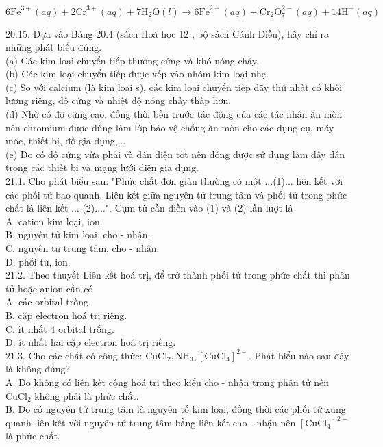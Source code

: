 \documentclass[10pt]{article}
\begin{document}
$$
6 \mathrm{Fe}^{3+}(a q)+2 \mathrm{Cr}^{3+}(a q)+7 \mathrm{H}_{2} \mathrm{O}(l) \rightarrow 6 \mathrm{Fe}^{2+}(a q)+\mathrm{Cr}_{2} \mathrm{O}_{7}^{2-}(a q)+14 \mathrm{H}^{+}(a q)
$$

20.15. Dựa vào Bảng 20.4 (sách Hoá học 12 , bộ sách Cánh Diều), hãy chỉ ra những phát biểu đúng.\\
(a) Các kim loại chuyển tiếp thường cứng và khó nóng chảy.\\
(b) Các kim loại chuyển tiếp được xếp vào nhóm kim loại nhẹ.\\
(c) So với calcium (là kim loại s), các kim loại chuyển tiếp dãy thứ nhất có khối lượng riêng, độ cứng và nhiệt độ nóng chảy thấp hơn.\\
(d) Nhờ có độ cứng cao, đồng thời bền trước tác động của các tác nhân ăn mòn nên chromium được dùng làm lớp bảo vệ chống ăn mòn cho các dụng cụ, máy móc, thiết bị, đồ gia dụng,...\\
(e) Do có độ cứng vừa phải và dẫn điện tốt nên đồng được sử dụng làm dây dẫn trong các thiết bị và mạng lưới điện gia dụng.\\
21.1. Cho phát biểu sau: "Phức chất đơn giản thường có một ...(1)... liên kết với các phối tử bao quanh. Liên kết giữa nguyên tử trung tâm và phối tử trong phức chất là liên kết ... (2)....". Cụm từ cần điền vào (1) và (2) lần lượt là\\
A. cation kim loại, ion.\\
B. nguyên tử kim loại, cho - nhận.\\
C. nguyên tữ trung tâm, cho - nhận.\\
D. phối tử, ion.\\
21.2. Theo thuyết Liên kết hoá trị, để trở thành phối tử trong phức chất thì phân tử hoặc anion cần có\\
A. các orbital trống.\\
B. cặp electron hoá trị riêng.\\
C. ît nhất 4 orbital trống.\\
D. ít nhất hai cặp electron hoá trị riêng.\\
21.3. Cho các chất có công thức: $\mathrm{CuCl}_{2}, \mathrm{NH}_{3},\left[\mathrm{CuCl}_{4}\right]^{2-}$. Phát biểu nào sau đây là không đúng?\\
A. Do không có liên kết cộng hoá trị theo kiểu cho - nhận trong phân tử nên $\mathrm{CuCl}_{2}$ không phải là phức chất.\\
B. Do có nguyên tử trung tâm là nguyên tố kim loại, đồng thời các phối tử xung quanh liên kết với nguyên tử trung tâm bằng liên kết cho - nhận nên $\left[\mathrm{CuCl}_{4}\right]^{2-}$ là phức chất.\\
\end{document}
